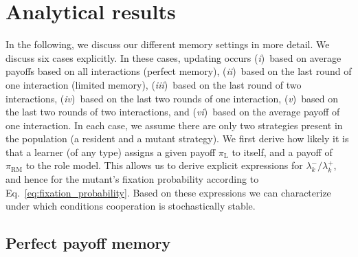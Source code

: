 \documentclass[11pt]{article}
\def\rolemodel{\text{RM}}
\def\learner{\text{L}}
\theoremstyle{plainCl1}
\theoremstyle{plainCl2}
\begin{document}
\newpage


\section{Analytical results}
\label{section:analyticalresults}


In the following, we discuss our different memory settings in more detail. 
We discuss six cases explicitly. In these cases, updating occurs
({\it i})~based on average payoffs based on all interactions (perfect memory), 
({\it ii})~based on the last round of one interaction (limited memory), 
({\it iii})~based on the last round of two interactions,
({\it iv})~based on the last two rounds of one interaction,
({\it v})~based on the last two rounds of two interactions, and
({\it vi})~based on the average payoff of one interaction.
In each case, we assume there are only two strategies present in the population (a resident and a mutant strategy). 
We first derive how likely it is that a learner (of any type) assigns a given payoff $\pi_\learner$ to itself, and a payoff of $\pi_\rolemodel$ to the role model. 
This allows us to derive explicit expressions for $\lambda^-_k/\lambda^+_k$, and hence for the mutant's fixation probability according to Eq.~\eqref{eq:fixation_probability}.
Based on these expressions we can characterize under which conditions cooperation is stochastically stable.  



\subsection{Perfect payoff memory}\label{section:perfect_memory}

\end{document}
